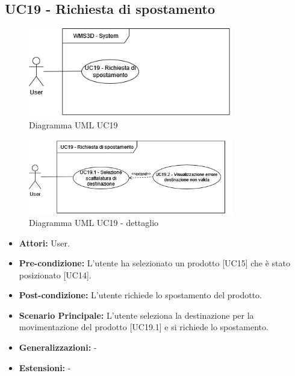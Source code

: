 \subsection{UC19 - Richiesta di spostamento}
\begin{figure}[H]
  \centering
  \includegraphics[width=0.8\textwidth]{UC_diagrams_11-20/UC19_sys.drawio.png}
   \caption{Diagramma UML UC19}
\end{figure}
\begin{figure}[H]
  \centering
  \includegraphics[width=0.8\textwidth]{UC_diagrams_11-20/UC19.drawio.png}
   \caption{Diagramma UML UC19 - dettaglio}
\end{figure}
\begin{itemize}
    \item \textbf{Attori:} User.
    \item \textbf{Pre-condizione:} L'utente ha selezionato un prodotto [UC15] che è stato posizionato [UC14].
    \item \textbf{Post-condizione:} L'utente richiede lo spostamento del prodotto.
    \item \textbf{Scenario Principale:} L'utente seleziona la destinazione per la movimentazione del prodotto [UC19.1] e si richiede lo spostamento.  
    \item \textbf{Generalizzazioni:} -
    \item \textbf{Estensioni:} -
\end{itemize}


